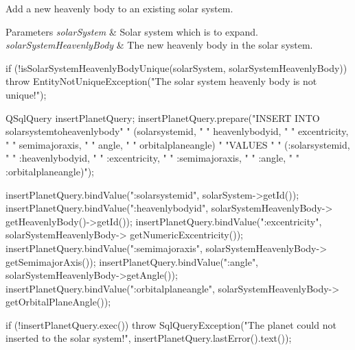 \label{d6/d91/classSolarSystemRepository_a365ea92e0a2ec7ec683222e89c74356b}


\-Add a new heavenly body to an existing solar system. 


\begin{DoxyParams}{\-Parameters}
{\em solar\-System} & \-Solar system which is to expand. \\
\hline
{\em solar\-System\-Heavenly\-Body} & \-The new heavenly body in the solar system. \\
\hline
\end{DoxyParams}

\begin{DoxyCode}
{
    if (!isSolarSystemHeavenlyBodyUnique(solarSystem, solarSystemHeavenlyBody))
    {
        throw EntityNotUniqueException("The solar system heavenly body is not
       unique!");
    }

    QSqlQuery insertPlanetQuery;
    insertPlanetQuery.prepare("INSERT INTO solarsystemtoheavenlybody"
                              "     (solarsystemid, "
                              "      heavenlybodyid, "
                              "      excentricity, "
                              "      semimajoraxis, "
                              "      angle, "
                              "      orbitalplaneangle) "
                              "VALUES "
                              "     (:solarsystemid, "
                              "      :heavenlybodyid, "
                              "      :excentricity, "
                              "      :semimajoraxis, "
                              "      :angle, "
                              "      :orbitalplaneangle)");

    insertPlanetQuery.bindValue(":solarsystemid", solarSystem->getId());
    insertPlanetQuery.bindValue(":heavenlybodyid", solarSystemHeavenlyBody->
      getHeavenlyBody()->getId());
    insertPlanetQuery.bindValue(":excentricity", solarSystemHeavenlyBody->
      getNumericExcentricity());
    insertPlanetQuery.bindValue(":semimajoraxis", solarSystemHeavenlyBody->
      getSemimajorAxis());
    insertPlanetQuery.bindValue(":angle", solarSystemHeavenlyBody->getAngle());
    insertPlanetQuery.bindValue(":orbitalplaneangle", solarSystemHeavenlyBody->
      getOrbitalPlaneAngle());

    if (!insertPlanetQuery.exec())
    {
        throw SqlQueryException("The planet could not inserted to the solar
       system!",
                                insertPlanetQuery.lastError().text());
    }
}
\end{DoxyCode}
